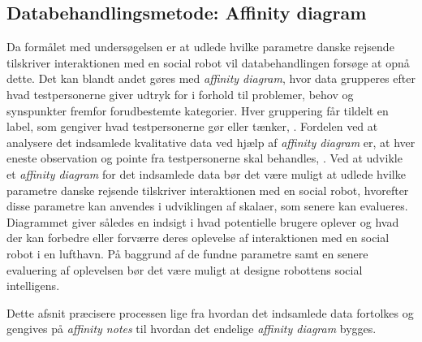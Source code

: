 \subsection{Databehandlingsmetode: Affinity diagram}
\label{ParametreMetodeovervejelserAffinityDiagram}
%
Da formålet med undersøgelsen er at udlede hvilke parametre danske rejsende tilskriver interaktionen med en social robot vil databehandlingen forsøge at opnå dette. Det kan blandt andet gøres med \textit{affinity diagram}, hvor data grupperes efter hvad testpersonerne giver udtryk for i forhold til problemer, behov og synspunkter fremfor forudbestemte kategorier. Hver gruppering får tildelt en label, som gengiver hvad testpersonerne gør eller tænker, \parencite[s. 159]{Book:BuildingAnAffinity}. Fordelen ved at analysere det indsamlede kvalitative data ved hjælp af \textit{affinity diagram} er, at hver eneste observation og pointe fra testpersonerne skal behandles, \parencite[s. 25]{PDF:ConsolidationIdeationAffinity}. Ved at udvikle et \textit{affinity diagram} for det indsamlede data bør det være muligt at udlede hvilke parametre danske rejsende tilskriver interaktionen med en social robot, hvorefter disse parametre kan anvendes i udviklingen af skalaer, som senere kan evalueres. Diagrammet giver således en indsigt i hvad potentielle brugere oplever og hvad der kan forbedre eller forværre deres oplevelse af interaktionen med en social robot i en lufthavn. På baggrund af de fundne parametre samt en senere evaluering af oplevelsen bør det være muligt at designe robottens social intelligens.   

Dette afsnit præcisere processen lige fra hvordan det indsamlede data fortolkes og gengives på \textit{affinity notes} til hvordan det endelige \textit{affinity diagram} bygges.

